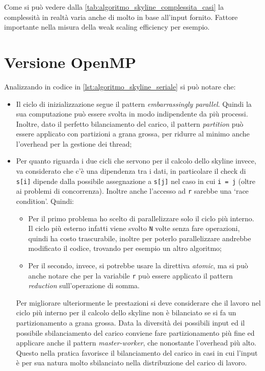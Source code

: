 \documentclass[12pt, a4paper]{article}
\begin{document}
Come si può vedere dalla \autoref{tab:algoritmo_skyline_complessita_casi} la complessità in realtà varia anche di molto in base
all'input fornito. Fattore importante nella misura della weak scaling efficiency per esempio.

\section{Versione OpenMP}

Analizzando in codice in \autoref{lst:algoritmo_skyline_seriale} si può notare che:

\begin{itemize}
  \item Il ciclo di inizializzazione segue il pattern \textit{embarrassingly parallel}.
        Quindi la sua computazione può essere svolta in modo indipendente da più processi.
        Inoltre, dato il perfetto bilanciamento del carico, il pattern \textit{partition} può essere applicato con partizioni
        a grana grossa, per ridurre al minimo anche l'overhead per la gestione dei thread;
  \item Per quanto riguarda i due cicli che servono per il calcolo dello skyline invece, va considerato che c'è una dipendenza tra
        i dati, in particolare il check di \texttt{s[i]} dipende dalla possibile assegnazione a \texttt{s[j]} nel caso in cui
        \texttt{i = j} (oltre ai problemi di concorrenza).
        Inoltre anche l'accesso ad \texttt{r} sarebbe una `race condition'.
        Quindi:
        \begin{itemize}
          \item Per il primo problema ho scelto di parallelizzare solo il ciclo più interno. Il ciclo più esterno infatti viene
                svolto \texttt{N} volte senza fare operazioni, quindi ha costo trascurabile, inoltre per poterlo parallelizzare
                andrebbe modificato il codice, trovando per esempio un altro algoritmo;
          \item Per il secondo, invece, si potrebbe usare la direttiva \textit{atomic}, ma si può anche notare che per la
                variabile \texttt{r} può essere applicato il pattern \textit{reduction} sull'operazione di somma.
        \end{itemize}
        Per migliorare ulteriormente le prestazioni si deve considerare che il lavoro nel ciclo più interno per il calcolo dello
        skyline non è bilanciato se si fa un partizionamento a grana grossa.
        Data la diversità dei possibili input ed il possibile sbilanciamento del carico conviene fare partizionamento più fine
        ed applicare anche il pattern \textit{master-worker}, che nonostante l'overhead più alto. Questo nella pratica favorisce
        il bilanciamento del carico in casi in cui l'input è per sua natura molto sbilanciato nella distribuzione del carico di
        lavoro.
\end{itemize}
\end{document}
